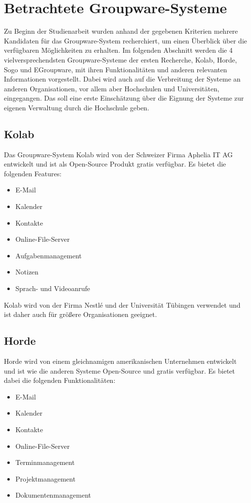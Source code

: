 \newpage

\section{Betrachtete Groupware-Systeme}

Zu Beginn der Studienarbeit wurden anhand der gegebenen Kriterien mehrere Kandidaten für das Groupware-System recherchiert, um einen Überblick über die verfügbaren Möglichkeiten zu erhalten.
Im folgenden Abschnitt werden die 4 vielversprechendsten Groupware-Systeme der ersten Recherche, Kolab, Horde, Sogo und EGroupware, mit ihren Funktionalitäten und anderen relevanten Informationen vorgestellt.
Dabei wird auch auf die Verbreitung der Systeme an anderen Organisationen, vor allem aber Hochschulen und Universitäten, eingegangen.
Das soll eine erste Einschätzung über die Eignung der Systeme zur eigenen Verwaltung durch die Hochschule geben.


\subsection{Kolab}

Das Groupware-System Kolab wird von der Schweizer Firma Aphelia IT AG entwickelt und ist als Open-Source Produkt gratis verfügbar. Es bietet die folgenden Features:
\begin{itemize}
    \item E-Mail
    \item Kalender
    \item Kontakte
    \item Online-File-Server
    \item Aufgabenmanagement
    \item Notizen
    \item Sprach- und Videoanrufe
\end{itemize}
\autocite[Quelle:][]{kolab}

Kolab wird von der Firma Nestlé und der Universität Tübingen verwendet und ist daher auch für größere Organisationen geeignet.

\subsection{Horde}

Horde wird von einem gleichnamigen amerikanischen Unternehmen entwickelt und ist wie die anderen Systeme Open-Source und gratis verfügbar. Es bietet dabei die folgenden Funktionalitäten:
\begin{itemize}
    \item E-Mail
    \item Kalender
    \item Kontakte
    \item Online-File-Server
    \item Terminmanagement
    \item Projektmanagement
    \item Dokumentenmanagement
    
\end{itemize}
\autocite[Quelle:][]{horde}

